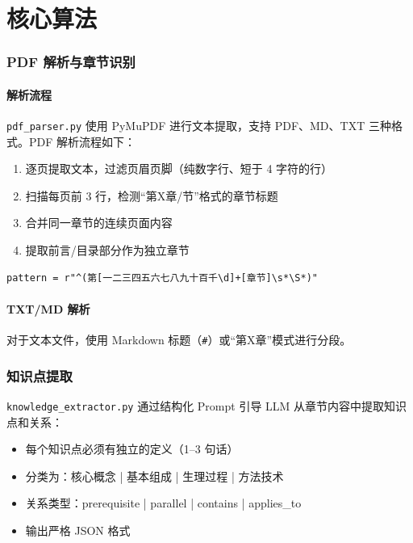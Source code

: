 \documentclass[12pt,a4paper]{article}
\begin{document}
\newpage
\part{核心算法}

\section{PDF 解析与章节识别}
\label{sec:pdf-parsing}

\subsection{解析流程}

\texttt{pdf\_parser.py} 使用 PyMuPDF 进行文本提取，支持 PDF、MD、TXT 三种格式。PDF 解析流程如下：

\begin{enumerate}[leftmargin=2em]
    \item 逐页提取文本，过滤页眉页脚（纯数字行、短于 4 字符的行）
    \item 扫描每页前 3 行，检测``第X章/节''格式的章节标题
    \item 合并同一章节的连续页面内容
    \item 提取前言/目录部分作为独立章节
\end{enumerate}

\begin{lstlisting}[title={章节标题检测正则}]
pattern = r"^(第[一二三四五六七八九十百千\d]+[章节]\s*\S*)"
\end{lstlisting}

\subsection{TXT/MD 解析}

对于文本文件，使用 Markdown 标题（\texttt{\#}）或``第X章''模式进行分段。

\section{知识点提取}
\label{sec:knowledge-extraction}

\texttt{knowledge\_extractor.py} 通过结构化 Prompt 引导 LLM 从章节内容中提取知识点和关系：

\begin{keybox}
\begin{itemize}[leftmargin=1em]
    \item 每个知识点必须有独立的定义（1--3 句话）
    \item 分类为：核心概念 | 基本组成 | 生理过程 | 方法技术
    \item 关系类型：prerequisite | parallel | contains | applies\_to
    \item 输出严格 JSON 格式
\end{itemize}
\end{keybox}
\end{document}
